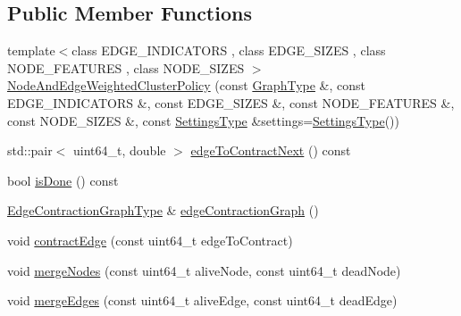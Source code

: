 \subsection*{Public Member Functions}
\begin{DoxyCompactItemize}
\item 
{\footnotesize template$<$class E\+D\+G\+E\+\_\+\+I\+N\+D\+I\+C\+A\+T\+O\+RS , class E\+D\+G\+E\+\_\+\+S\+I\+Z\+ES , class N\+O\+D\+E\+\_\+\+F\+E\+A\+T\+U\+R\+ES , class N\+O\+D\+E\+\_\+\+S\+I\+Z\+ES $>$ }\\\hyperlink{classnifty_1_1graph_1_1agglo_1_1NodeAndEdgeWeightedClusterPolicy_a7ba043c2461fc998dff07fa8c35c8f76}{Node\+And\+Edge\+Weighted\+Cluster\+Policy} (const \hyperlink{classnifty_1_1graph_1_1agglo_1_1NodeAndEdgeWeightedClusterPolicy_a293d476ffc7b8513eeb20c21bfefb579}{Graph\+Type} \&, const E\+D\+G\+E\+\_\+\+I\+N\+D\+I\+C\+A\+T\+O\+RS \&, const E\+D\+G\+E\+\_\+\+S\+I\+Z\+ES \&, const N\+O\+D\+E\+\_\+\+F\+E\+A\+T\+U\+R\+ES \&, const N\+O\+D\+E\+\_\+\+S\+I\+Z\+ES \&, const \hyperlink{structnifty_1_1graph_1_1agglo_1_1NodeAndEdgeWeightedClusterPolicy_1_1SettingsType}{Settings\+Type} \&settings=\hyperlink{structnifty_1_1graph_1_1agglo_1_1NodeAndEdgeWeightedClusterPolicy_1_1SettingsType}{Settings\+Type}())
\item 
std\+::pair$<$ uint64\+\_\+t, double $>$ \hyperlink{classnifty_1_1graph_1_1agglo_1_1NodeAndEdgeWeightedClusterPolicy_a0f5da6b06eeac28d789865bfe6450b07}{edge\+To\+Contract\+Next} () const
\item 
bool \hyperlink{classnifty_1_1graph_1_1agglo_1_1NodeAndEdgeWeightedClusterPolicy_a79eb68aba4a0a48f33e757f7e40b8bbe}{is\+Done} () const
\item 
\hyperlink{classnifty_1_1graph_1_1agglo_1_1NodeAndEdgeWeightedClusterPolicy_a467e2768e424a998379deedaaebfe9a9}{Edge\+Contraction\+Graph\+Type} \& \hyperlink{classnifty_1_1graph_1_1agglo_1_1NodeAndEdgeWeightedClusterPolicy_ae1c49f97ec8e6c52b5ab36bf355c2022}{edge\+Contraction\+Graph} ()
\item 
void \hyperlink{classnifty_1_1graph_1_1agglo_1_1NodeAndEdgeWeightedClusterPolicy_ac9ee8dd91c7b322b85ea0a92c6c40918}{contract\+Edge} (const uint64\+\_\+t edge\+To\+Contract)
\item 
void \hyperlink{classnifty_1_1graph_1_1agglo_1_1NodeAndEdgeWeightedClusterPolicy_a250a448d4fd3b9181b667ae7e9782fa8}{merge\+Nodes} (const uint64\+\_\+t alive\+Node, const uint64\+\_\+t dead\+Node)
\item 
void \hyperlink{classnifty_1_1graph_1_1agglo_1_1NodeAndEdgeWeightedClusterPolicy_afe46489c03ca7bf98b2f84d79981b434}{merge\+Edges} (const uint64\+\_\+t alive\+Edge, const uint64\+\_\+t dead\+Edge)

\end{DoxyCompactItemize}
